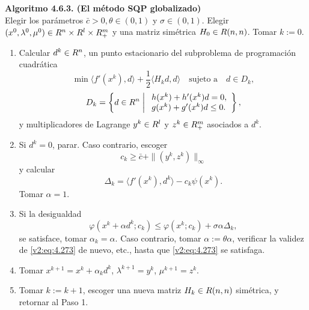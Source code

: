 \noindent \textbf{Algoritmo 4.6.3. (El método SQP globalizado)} \\
Elegir los parámetros $\bar{c} > 0, \theta \in (0, 1)$ y $\sigma \in (0, 1)$.
Elegir $(x^0, \lambda^0, \mu^0) \in R^n \times R^l \times R^m_+$ y una matriz simétrica $H_0 \in R(n, n)$. Tomar $k := 0$.
\begin{enumerate}
    \item Calcular $d^k \in R^n$, un punto estacionario del subproblema de programación cuadrática
    \begin{equation}
        \min \langle f'(x^k), d \rangle + \frac{1}{2}\langle H_k d, d \rangle \quad \text{sujeto a} \quad d \in D_k,
        \label{v2:eq:4.269}
    \end{equation}
    \begin{equation}
        D_k = \left\{ d \in R^n \;\middle|\; \begin{array}{l} h(x^k) + h'(x^k)d = 0, \\ g(x^k) + g'(x^k)d \le 0. \end{array} \right\},
        \label{v2:eq:4.270}
    \end{equation}
    y multiplicadores de Lagrange $y^k \in R^l$ y $z^k \in R^m_+$ asociados a $d^k$.
    \item Si $d^k = 0$, parar. Caso contrario, escoger
    \begin{equation}
        c_k \ge \bar{c} + \|(y^k, z^k)\|_\infty
        \label{v2:eq:4.271}
    \end{equation}
    y calcular
    \begin{equation}
        \Delta_k = \langle f'(x^k), d^k \rangle - c_k\psi(x^k).
        \label{v2:eq:4.272}
    \end{equation}
    Tomar $\alpha = 1$.
    \item Si la desigualdad
    \begin{equation}
        \varphi(x^k + \alpha d^k; c_k) \le \varphi(x^k; c_k) + \sigma\alpha\Delta_k,
        \label{v2:eq:4.273}
    \end{equation}
    se satisface, tomar $\alpha_k = \alpha$. Caso contrario, tomar $\alpha := \theta\alpha$, verificar la validez de \eqref{v2:eq:4.273} de nuevo, etc., hasta que \eqref{v2:eq:4.273} se satisfaga.
    \item Tomar $x^{k+1} = x^k + \alpha_k d^k$, $\lambda^{k+1} = y^k$, $\mu^{k+1} = z^k$.
    \item Tomar $k := k + 1$, escoger una nueva matriz $H_k \in R(n, n)$ simétrica, y retornar al Paso 1.
\end{enumerate}

